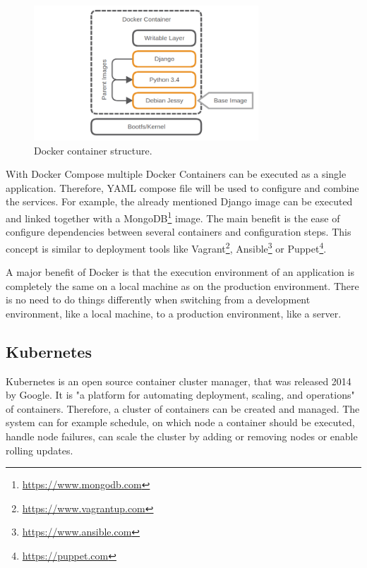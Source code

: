 \begin{figure}[H]
    \centering
    \includegraphics[width=0.75\textwidth]{resources/images/docker_container_structure.png}
    \caption[Docker container structure]{Docker container structure.}
    \label{fig:docker_container_structure}
\end{figure}

With Docker Compose multiple Docker Containers can be executed as a single application.
Therefore, YAML compose file will be used to configure and combine the services.
For example, the already mentioned Django image can be executed and linked together with a MongoDB\footnote{\url{https://www.mongodb.com}} image.
The main benefit is the ease of configure dependencies between several containers and configuration steps.
This concept is similar to deployment tools like Vagrant\footnote{\url{https://www.vagrantup.com}}, Ansible\footnote{\url{https://www.ansible.com}} or Puppet\footnote{\url{https://puppet.com}}.

A major benefit of Docker is that the execution environment of an application is completely the same on a local machine as on the production environment.\autocite[cf.][p. 2]{Gallagher:2015}
There is no need to do things differently when switching from a development environment, like a local machine, to a production environment, like a server.\autocite[cf.][p. 2]{Gallagher:2015}

\subsection{Kubernetes}
\label{subsection:state-of-the-art:kubernetes}
Kubernetes is an open source container cluster manager, that was released 2014 by Google.
It is "a platform for automating deployment, scaling, and operations"\autocite[p. 1]{Grant:2015} of containers.
Therefore, a cluster of containers can be created and managed.
The system can for example schedule, on which node a container should be executed, handle node failures, can scale the cluster by adding or removing nodes or enable rolling updates.\autocite[p. 5 f.]{Grant:2015}

